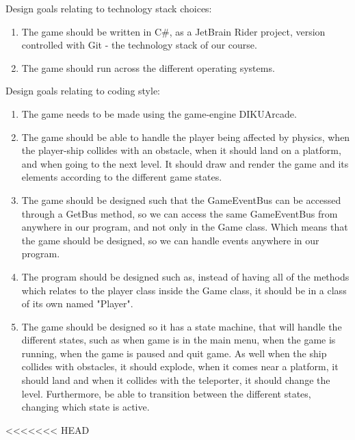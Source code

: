 \documentclass[../master.tex]{subfile}
\begin{document}
Design goals relating to technology stack choices:
\begin{enumerate}
	\item The game should be written in C\#, as a JetBrain Rider project, version controlled with Git - the technology stack of our course.
	\item The game should run across the different operating systems. 
\end{enumerate}

Design goals relating to coding style:
\begin{enumerate}
	\item The game needs to be made using the game-engine DIKUArcade.
	\item The game should be able to handle the player being affected by physics, when the player-ship collides with an obstacle, when it should land on a platform, and when going to the next level. It should draw and render the game and its elements according to the different game states. 
	\item The game should be designed such that the GameEventBus can be accessed through a GetBus method, so we can access the same GameEventBus from anywhere in our program, and not only in the Game class. Which means that the game should be designed, so we can handle events anywhere in our program.
	\item The program should be designed such as, instead of having all of the methods which relates to the player class inside the Game class, it should be in a class of its own named "Player".
	\item The game should be designed so it has a state machine, that will handle the different states, such as when game is in the main menu, when the game is running, when the game is paused and quit game. As well when the ship collides with obstacles, it should explode, when it comes near a platform, it should land and when it collides with the teleporter, it should change the level. Furthermore, be able to transition between the different states, changing which state is active.
\end{enumerate}

<<<<<<< HEAD
\end{document}
